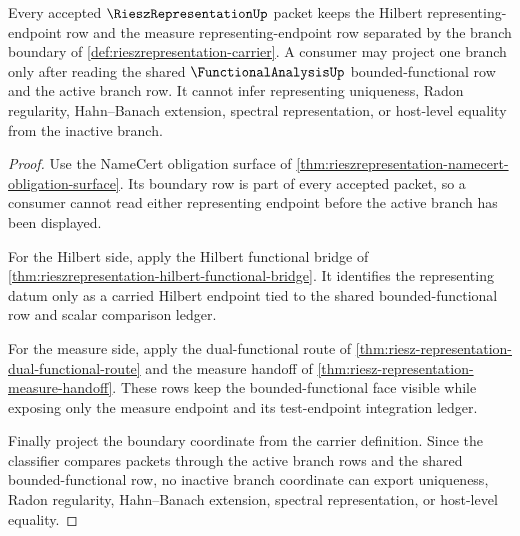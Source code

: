 \begin{theorem}
\label{thm:riesz-representation-branch-boundary-nonescape}
Every accepted $\RieszRepresentationUp$ packet keeps the Hilbert representing-endpoint row and the measure representing-endpoint row separated by the branch boundary of \autoref{def:rieszrepresentation-carrier}. A consumer may project one branch only after reading the shared $\FunctionalAnalysisUp$ bounded-functional row and the active branch row. It cannot infer representing uniqueness, Radon regularity, Hahn--Banach extension, spectral representation, or host-level equality from the inactive branch.
\end{theorem}
\begin{proof}
Use the NameCert obligation surface of \autoref{thm:rieszrepresentation-namecert-obligation-surface}. Its boundary row is part of every accepted packet, so a consumer cannot read either representing endpoint before the active branch has been displayed.

For the Hilbert side, apply the Hilbert functional bridge of \autoref{thm:rieszrepresentation-hilbert-functional-bridge}. It identifies the representing datum only as a carried Hilbert endpoint tied to the shared bounded-functional row and scalar comparison ledger.

For the measure side, apply the dual-functional route of \autoref{thm:riesz-representation-dual-functional-route} and the measure handoff of \autoref{thm:riesz-representation-measure-handoff}. These rows keep the bounded-functional face visible while exposing only the measure endpoint and its test-endpoint integration ledger.

Finally project the boundary coordinate from the carrier definition. Since the classifier compares packets through the active branch rows and the shared bounded-functional row, no inactive branch coordinate can export uniqueness, Radon regularity, Hahn--Banach extension, spectral representation, or host-level equality.
\end{proof}

